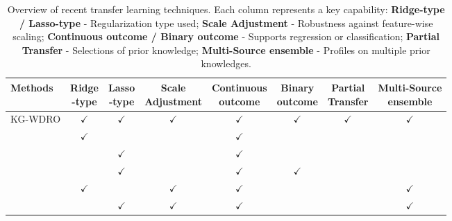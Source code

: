 \begin{table*}[!ht]
\caption{Overview of recent transfer learning techniques. Each column represents a key capability:  
\textbf{Ridge-type / Lasso-type} - Regularization type used;  
\textbf{Scale Adjustment} - Robustness against feature-wise scaling;  
\textbf{Continuous outcome / Binary outcome} - Supports regression or classification;  
\textbf{Partial Transfer} - Selections of prior knowledge;  
\textbf{Multi-Source ensemble} - Profiles on multiple prior knowledges.}
\label{tab:comparison}
\vskip 0.1in
\begin{center}
\begin{small}
\setlength{\tabcolsep}{3pt} %
\renewcommand{\arraystretch}{1.1} %
\begin{tabular}{lccccccc}
\toprule
Methods & \makecell{Ridge \\ -type}  & \makecell{Lasso \\ -type} & \makecell{Scale \\ Adjustment} & \makecell{Continuous \\ outcome} & \makecell{Binary \\ outcome} & \makecell{Partial \\ Transfer} & \makecell{Multi-Source \\ ensemble} \\
\midrule
KG-WDRO   & $\checkmark$ & $\checkmark$ & $\checkmark$ & $\checkmark$ &  $\checkmark$ & $\checkmark$& $\checkmark$\\
\citet{bastani2020predicting} & $\checkmark$ &  & & $\checkmark$ & & & \\
\citet{li2021translasso} & & $\checkmark$ &  & $\checkmark$ &   &  &  \\
\citet{tian2023transglm} &  & $\checkmark$ & & $\checkmark$ &  $\checkmark$ &  &  \\
\citet{gu2024angle-based} & $\checkmark$ &  & $\checkmark$ & $\checkmark$ &  &  & $\checkmark$ \\
\citet{lin2024profiled} &  & $\checkmark$ & $\checkmark$ & $\checkmark$ &   &  & $\checkmark$ \\
\bottomrule
\end{tabular}
\end{small}
\end{center}
\end{table*}